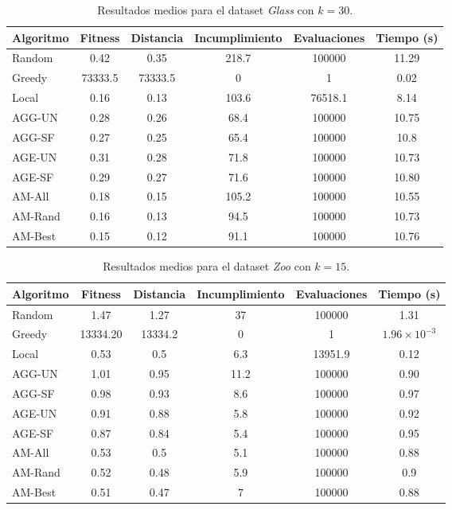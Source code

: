 \documentclass[a4paper,12pt]{article}%
\begin{document}
\begin{table}[H]
	\centering
	\begin{tabular}{|l|ccccc|}
		\hline
		Algoritmo & Fitness & Distancia & Incumplimiento & Evaluaciones & Tiempo (s) \\
		\hline
		Random & 0.42 & 0.35 & 218.7 & 100000 & 11.29 \\
		Greedy & 73333.5 & 73333.5 & 0 & 1 & 0.02 \\
		Local  & 0.16 & 0.13 & 103.6 & 76518.1 & 8.14 \\
		AGG-UN & 0.28 & 0.26 & 68.4 & 100000 & 10.75 \\
		AGG-SF & 0.27 & 0.25 & 65.4 & 100000 & 10.8 \\
		AGE-UN & 0.31 & 0.28 & 71.8 & 100000 & 10.73 \\
		AGE-SF & 0.29 & 0.27 & 71.6 & 100000 & 10.80 \\
		AM-All & 0.18 & 0.15 & 105.2 & 100000 & 10.55 \\
		AM-Rand & 0.16 & 0.13 & 94.5 & 100000 & 10.73 \\
		AM-Best & 0.15 & 0.12 & 91.1 & 100000 & 10.76 \\
		\hline
	\end{tabular}
	\caption{Resultados medios para el dataset \textit{Glass} con $k=30$.}
	\label{tab_glass30}
\end{table}

\begin{table}[H]
	\centering
	\begin{tabular}{|l|ccccc|}
		\hline
		Algoritmo & Fitness & Distancia & Incumplimiento & Evaluaciones & Tiempo (s) \\
		\hline
		Random & 1.47 & 1.27 & 37 & 100000 & 1.31 \\
		Greedy & 13334.20 & 13334.2 & 0 & 1 & $1.96\times10^{-3}$ \\
		Local  & 0.53 & 0.5 & 6.3 & 13951.9 & 0.12 \\
		AGG-UN & 1.01 & 0.95 & 11.2 & 100000 & 0.90 \\
		AGG-SF & 0.98 & 0.93 & 8.6 & 100000 & 0.97 \\
		AGE-UN & 0.91 & 0.88 & 5.8 & 100000 & 0.92 \\
		AGE-SF & 0.87 & 0.84 & 5.4 & 100000 & 0.95 \\
		AM-All & 0.53 & 0.5 & 5.1 & 100000 & 0.88 \\
		AM-Rand & 0.52 & 0.48 & 5.9 & 100000 & 0.9 \\
		AM-Best & 0.51 & 0.47 & 7 & 100000 & 0.88 \\
		\hline
	\end{tabular}
	\caption{Resultados medios para el dataset \textit{Zoo} con $k=15$.}
	\label{tab_zoo15}
\end{table}
\end{document}
